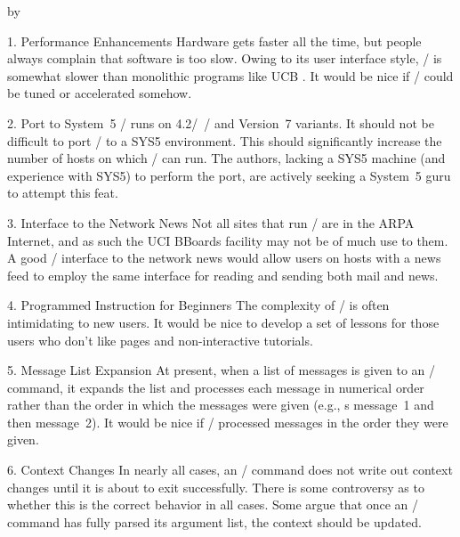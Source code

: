 {\advance\leftskip by\parindent
\item{1.} Performance Enhancements\hbreak
Hardware gets faster all the time, but people always complain that software
is too slow.
Owing to its user interface style,
\MH/ is somewhat slower than monolithic programs like UCB .
It would be nice if \MH/ could be tuned or accelerated somehow.

\item{2.} Port to System~5\hbreak
\MH/ runs on 4.2\bsd/~\unix/ and Version~7 variants.
It should not be difficult to port \MH/ to a SYS5 environment.
This should significantly increase the number of hosts
on which \MH/ can run.
The authors,
lacking a SYS5 machine (and experience with SYS5) to perform the port,
are actively seeking a System~5 guru to attempt this feat.

\item{3.} Interface to the Network News\hbreak
Not all sites that run \MH/ are in the ARPA Internet,
and as such the UCI BBoards facility may not be of much use to them.
A good \MH/ interface to the network news would allow users on hosts with a
news feed to employ the same interface for reading and sending both mail and
news.

\item{4.} Programmed Instruction for Beginners\hbreak
The complexity of \MH/ is often intimidating to new users.
It would be nice to develop a set of  lessons for those users who
don't like  pages and non-interactive tutorials.

\item{5.} Message List Expansion\hbreak
At present, when a list of messages is given to an \MH/ command,
it expands the list and processes each message in numerical order
rather than the order in which the messages were given
(e.g.,  s message~1
and then message~2).
It would be nice if \MH/ processed messages in the order
they were given.

\item{6.} Context Changes\hbreak
In nearly all cases,
an \MH/ command does not write out context changes until it is about to exit
successfully.
There is some controversy as to whether this is the correct behavior
in all cases.
Some argue that once an \MH/ command has fully parsed its argument list,
the context should be updated.
\par}
